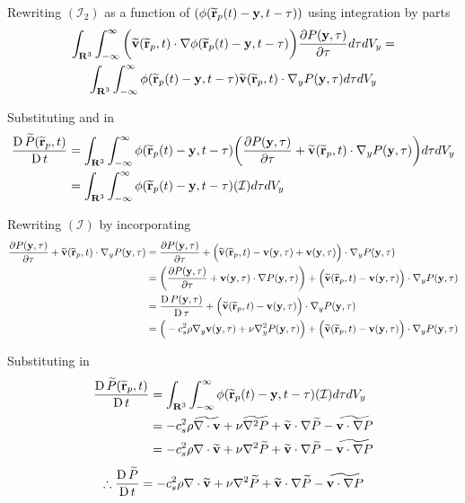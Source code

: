 Rewriting $(\mathcal{I}_2)$ as a function of $(\phi (\widetilde{\mathbf{r}}_p(t)-\mathbf{y}, t-\tau))$ using integration by parts
\begin{multline}
    \IntRThreeAndT \bigg(\TildeVArgRp \cdot \nabla \PhiRY \bigg) \PartialDerivative[\tau]{\PY} \IntD =\\ \IntRThreeAndT \PhiRY \TildeVArgRp \cdot  \nabla_y \PY \IntD
    \label{eq:i2-phi}
\end{multline}

Substituting  and  in 
\begin{equation}
    \begin{split}
        \LagDerivative{\TilePArgRp} & = \IntRThreeAndT \PhiRY \bigg(\PartialDerivative[\tau]{\PY} + \TildeVArgRp \cdot \nabla_y \PY \bigg)\IntD \\
        & = \IntRThreeAndT \PhiRY (\mathcal{I}) \IntD
    \end{split}
    \label{eq:phi-simplified-P-eq}
\end{equation}


Rewriting $(\mathcal{I})$ by incorporating 
\begin{equation}
    \begin{split}
        \PartialDerivative[\tau]{\PY} + \TildeVArgRp \cdot \nabla_y \PY & = \PartialDerivative[\tau]{\PY} + \Big(\TildeVArgRp - \VY + \VY \Big) \cdot \nabla_y \PY \\
        & = \bigg(\PartialDerivative[\tau]{\PY} + \VY \cdot \nabla \PY \bigg) + \Big(\TildeVArgRp - \VY \Big) \cdot \nabla_y \PY \\
        & = \LagDerivative[\tau]{\PY} + \Big(\TildeVArgRp - \VY \Big) \cdot \nabla_y \PY \\
        & = \Big(-c_s^2 \rho \nabla_y \VY + \nu \nabla^2_y \PY   \Big) + \Big(\TildeVArgRp - \VY \Big) \cdot \nabla_y \PY
    \end{split}
    \label{eq:simplified-integrand}
\end{equation}

Substituting  in 
\begin{equation}
    \begin{split}
        \frac{\operatorname{D} \widetilde{P}(\widetilde{\mathbf{r}}_p, t)}{\operatorname{D} t} & = \int_{\mathbf{R}^3} \int_{-\infty}^{\infty} \phi (\widetilde{\mathbf{r}}_p(t)-\mathbf{y}, t-\tau) (\mathcal{I}) d \tau d V_y \\
        & = -c_s^2 \rho \widetilde{\nabla \cdot \mathbf{v}} + \nu \widetilde{\nabla^2 P} + \widetilde{\mathbf{v}} \cdot \nabla \widetilde{P} - \widetilde{\mathbf{v} \cdot \nabla P} \\
        & = -c_s^2 \rho \nabla \cdot \widetilde{\mathbf{v}} + \nu \nabla^2 \widetilde{P}  + \widetilde{\mathbf{v}} \cdot \nabla \widetilde{P} - \widetilde{\mathbf{v} \cdot \nabla P}
    \end{split}
\end{equation}
\begin{equation}
    \therefore \frac{\operatorname{D} \widetilde{P}}{\operatorname{D} t} = -c_s^2 \rho \nabla \cdot \widetilde{\mathbf{v}} + \nu \nabla^2 \widetilde{P} + \widetilde{\mathbf{v}} \cdot \nabla \widetilde{P} - \widetilde{\mathbf{v}\cdot\nabla P}
\end{equation}